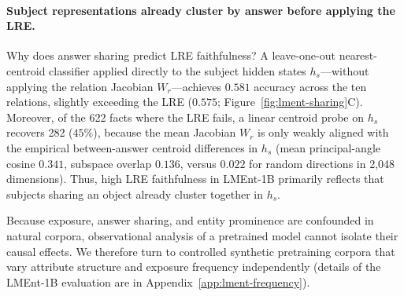 \paragraph{Subject representations already cluster by answer before applying the LRE.}
Why does answer sharing predict LRE faithfulness? A leave-one-out
nearest-centroid classifier applied directly to the subject hidden states
$h_s$---without applying the relation Jacobian $W_r$---achieves $0.581$ accuracy
across the ten relations, slightly exceeding the LRE ($0.575$;
Figure~\ref{fig:lment-sharing}C). Moreover, of the 622 facts where the LRE
fails, a linear centroid probe on $h_s$ recovers 282 ($45\%$), because the mean
Jacobian $W_r$ is only weakly aligned with the empirical between-answer centroid
differences in $h_s$ (mean principal-angle cosine $0.341$, subspace overlap
$0.136$, versus $0.022$ for random directions in 2,048 dimensions). Thus, high
LRE faithfulness in LMEnt-1B primarily reflects that subjects sharing an object
already cluster together in $h_s$.

Because exposure, answer sharing, and entity prominence are confounded in
natural corpora, observational analysis of a pretrained model cannot isolate
their causal effects. We therefore turn to controlled synthetic pretraining
corpora that vary attribute structure and exposure frequency independently
(details of the LMEnt-1B evaluation are in Appendix~\ref{app:lment-frequency}).
